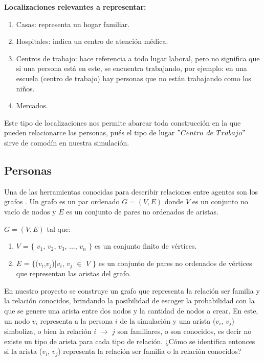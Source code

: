\textbf{Localizaciones relevantes a representar:}
\begin{enumerate}
    \item Casas: representa un hogar familiar.
    \item Hospitales: indica un centro de atención médica.
    \item Centros de trabajo: hace referencia a todo lugar laboral, pero no significa que si una persona está en este, se encuentra trabajando, por ejemplo: en una escuela (centro de trabajo) hay personas que no están trabajando como los niños.
    \item Mercados.
\end{enumerate}

Este tipo de localizaciones nos permite abarcar toda construcción en la que pueden relacionarce las personas, pués
el tipo de lugar $"Centro$ $de$ $Trabajo"$ sirve de comodín en nuestra simulación.\\

\subsection{Personas}
Una de las herramientas conocidas para describir relaciones entre agentes son los grafos \autocite{Newman2003}. Un grafo
es un par ordenado $G = (V,E)$ donde $V$ es un conjunto no vacío de nodos y $E$ es un conjunto de pares 
no ordenados de aristas.\\

\begin{center}
    $G=(V,E)$ tal que:\\
    \begin{enumerate}
        \item $V$ = $\lbrace$ $v_{1}$, $v_{2}$, $v_{3}$, ..., $v_{n}$ $\rbrace$ es un conjunto finito de vértices.
        \item $E$ = $\lbrace$($v_{i}$,$v_{j}$)|$v_{i}$, $v_{j}$ $\in$ $V$ $\rbrace$  es un conjunto de pares no ordenados de vértices que representan las aristas del grafo.
    \end{enumerate}
\end{center}

En nuestro proyecto se construye un grafo que representa la relación ser familia y la relación conocidos, brindando
la posibilidad de escoger la probabilidad con la que se genere una arista entre dos nodos y la cantidad de nodos a crear. 
En este, un nodo $v_{i}$ representa a la persona $i$ de la simulación y una arista ($v_{i}$, $v_{j}$) simboliza,
o bien la relación $i$ $\rightarrow$ $j$ son familiares, o son conocidos, es decir no existe un tipo de arista para cada
tipo de relación. ¿Cómo se identifica entonces si la arista ($v_{i}$, $v_{j}$) representa la relación 
ser familia o la relación conocidos?\\

